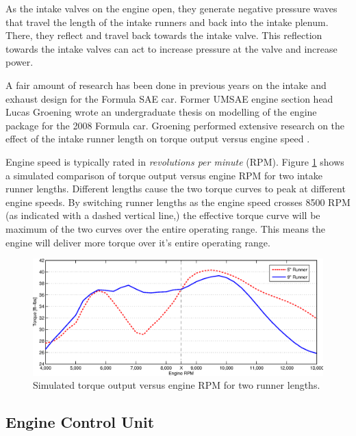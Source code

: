 As the intake valves on the engine open, they generate negative pressure waves that travel the length of the intake runners and back into the intake plenum. There, they reflect and travel back towards the intake valve. This reflection towards the intake valves can act to increase pressure at the valve and increase power.


A fair amount of research has been done in previous years on the intake and exhaust design for the Formula SAE car. Former UMSAE engine section head Lucas Groening wrote an undergraduate thesis on modelling of the engine package for the 2008 Formula car. Groening performed extensive research on the effect of the intake runner length on torque output versus engine speed \cite{LucasIntake}. 

Engine speed is typically rated in \emph{revolutions per minute} (RPM). Figure \ref{fig:irl_effect} shows a simulated comparison of torque output versus engine RPM for two intake runner lengths. Different lengths cause the two torque curves to peak at different engine speeds. By switching runner lengths as the engine speed crosses 8500 RPM (as indicated with a dashed vertical line,) the effective torque curve will be maximum of the two curves over the entire operating range. This means the engine will deliver more torque over it's entire operating range.

\begin{figure}[H]
\centering
\includegraphics[width=6in,keepaspectratio]{background/figures/irl_effect2.eps}
\caption{Simulated torque output versus engine RPM for two runner lengths.}
\label{fig:irl_effect}
\end{figure}

\subsection{Engine Control Unit\label{sec:ECU}}

